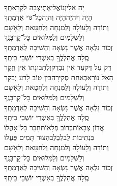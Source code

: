 \documentclass[twoside, openany, parskip=half, 11pt]{book}
\begin{document}
\begin{sometimes}
\negline
\begin{narrow}
\\
יָהּ אֵלִי\hfill וְגוֹאֲלִי\hfill אֶתְיַצְבָה לִקְרָאתֶֽךָ\\
הָיָה וְיִהְיֶה\hfill הָיָה וְהֹוֶה\hfill כׇּל־גּוֹי אַדְמָתֶֽךָ\\
וְתוֹדָה וְלָעוֹלָה וְלַמִּנְחָה וְלַחַטָּאת וְלָאָשָׁם \\
וְלַשְּׁלָמִים וְלַמִּלוּאִים כׇּל־קׇרְבָּנֶֽךָ\\
זְכוֹר נִלְאָה אֲשֶׁר נָשְׂאָה וְהָשִׁיבָה לְאַדְמָתֶֽךָ\\
סֶֽלָה אֲהַלְלֶֽךָּ בְּאַשְׁרֵי יוֹשְׁבֵי בֵיתֶֽךָ\\
דַּק עַל דַּק\hfill עַד אֵין נִבְדַק\hfill וְלִתְבוּנָתוֹ אֵין חֵֽקֶר\\
הָאֵל נוֹרָא\hfill בְּאַחַת סְקִירָה\hfill בֵּין טוֹב לָרַע יְבַקֵּר\\
וְתוֹדָה וְלָעוֹלָה וְלַמִּנְחָה וְלַחַטָּאת וְלָאָשָׁם \\
וְלַשְּׁלָמִים וְלַמִּלוּאִים כׇּל־קׇרְבָּנֶֽךָ\\
זְכוֹר נִלְאָה אֲשֶׁר נָשְׂאָה וְהָשִׁיבָה לְאַדְמָתֶֽךָ\\
סֶֽלָה אֲהַלְלֶֽךָּ בְּאַשְׁרֵי יוֹשְׁבֵי בֵיתֶֽךָ\\
אֲדוֹן צְבָאוֹת\hfill בְּרוֹב פְּלָאוֹת\hfill חִבֵּר כׇּל־אׇהֳלוֹ\\
בִּנְתִיבוֹת לֵב\hfill לִבְלֵב\hfill הַצּוּר תָּמִים פׇּעֳלוֹ\\
וְתוֹדָה וְלָעוֹלָה וְלַמִּנְחָה וְלַחַטָּאת וְלָאָשָׁם \\
וְלַשְּׁלָמִים וְלַמִּלוּאִים כׇּל־קׇרְבָּנֶֽךָ\\
זְכוֹר נִלְאָה אֲשֶׁר נָשְׂאָה וְהָשִׁיבָה לְאַדְמָתֶֽךָ\\
סֶֽלָה אֲהַלְלֶֽךָּ בְּאַשְׁרֵי יוֹשְׁבֵי בֵיתֶֽךָ
\end{narrow}

\end{sometimes}
\end{document}
